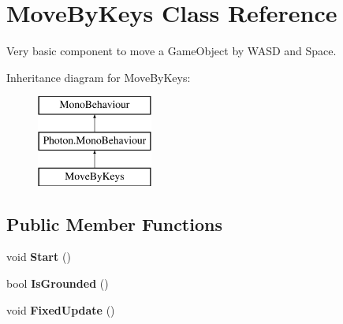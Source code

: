 \hypertarget{class_move_by_keys}{}\section{Move\+By\+Keys Class Reference}
\label{class_move_by_keys}


Very basic component to move a Game\+Object by W\+A\+SD and Space.  


Inheritance diagram for Move\+By\+Keys\+:\begin{figure}[H]
\begin{center}
\leavevmode
\includegraphics[height=3.000000cm]{class_move_by_keys}
\end{center}
\end{figure}
\subsection*{Public Member Functions}
\begin{DoxyCompactItemize}
\item 
void {\bfseries Start} ()\hypertarget{class_move_by_keys_a12c386cc63b886a811e2801c6631f7c6}{}\label{class_move_by_keys_a12c386cc63b886a811e2801c6631f7c6}

\item 
bool {\bfseries Is\+Grounded} ()\hypertarget{class_move_by_keys_a12f570fff90c264f8ff855d82886d732}{}\label{class_move_by_keys_a12f570fff90c264f8ff855d82886d732}

\item 
void {\bfseries Fixed\+Update} ()\hypertarget{class_move_by_keys_aeeea5b489d6daab0aa8e9fc1672f5310}{}\label{class_move_by_keys_aeeea5b489d6daab0aa8e9fc1672f5310}

\end{DoxyCompactItemize}

